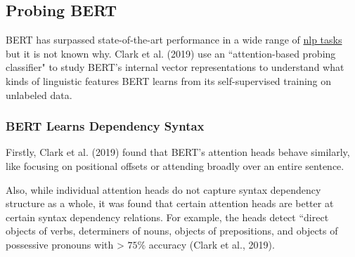 \subsection{Probing BERT} \label{sec:ProbingBERT}

BERT has surpassed state-of-the-art performance in a wide range of \hyperref[app:Appendix_NLPTasks]{nlp tasks} but it is not known why. Clark et al. (2019) use an ``attention-based probing classifier" to study BERT's internal vector representations to understand what kinds of linguistic features BERT learns from its self-supervised training on unlabeled data. 



\subsubsection{BERT Learns Dependency Syntax} \label{sec:BERTLearnsSyntax}

Firstly, Clark et al. (2019) found that BERT's attention heads behave similarly, like focusing on positional offsets or attending broadly over an entire sentence. 

Also, while individual attention heads do not capture syntax dependency structure as a whole, it was found that certain attention heads are better at certain syntax dependency relations. For example, the heads detect ``direct objects of verbs, determiners of nouns, objects of prepositions, and objects of possessive pronouns with > $75 \%$ accuracy (Clark et al., 2019). 

